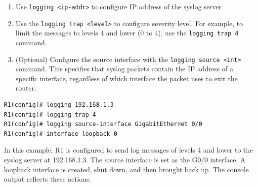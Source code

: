 \begin{enumerate}
\item Use \verb|logging <ip-addr>| to configure IP address of the syslog server

\item Use the \verb|logging trap <level>| to configure severity level. For example, to limit the messages to levels 4 and lower (0 to 4), use the \verb|logging trap 4| command.

\item (Optional) Configure the source interface with the \verb|logging source <int>| command. This specifies that syslog packets contain the IP address of a specific interface, regardless of which interface the packet uses to exit the router.
\end{enumerate}

\begin{verbatim}
R1(config)# logging 192.168.1.3
R1(config)# logging trap 4
R1(config)# logging source-interface GigabitEthernet 0/0
R1(config)# interface loopback 0
\end{verbatim}

In this example, R1 is configured to send log messages of levels 4 and lower to the syslog server at 192.168.1.3. The source interface is set as the G0/0 interface. A loopback interface is created, shut down, and then brought back up. The console output reflects these actions.